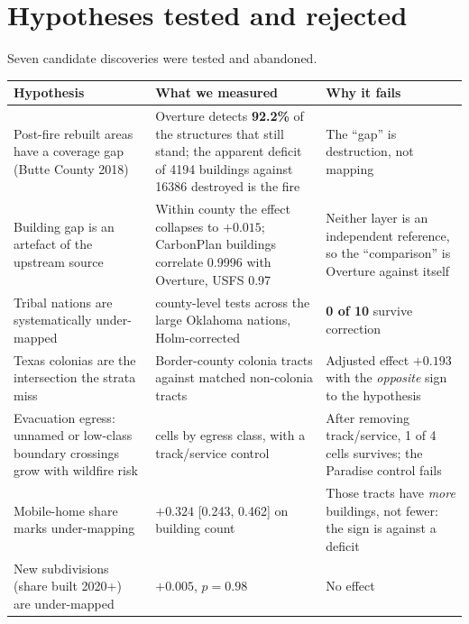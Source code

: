 \documentclass[a4paper]{article}
\begin{document}
\section{Hypotheses tested and rejected}

Seven candidate discoveries were tested and abandoned.

\noindent\begin{minipage}{\textwidth}
\small
{}
\label{tab:rejected}
\begin{tabular}{@{}>{\raggedright\arraybackslash}p{3.2cm}>{\raggedright\arraybackslash}p{4.9cm}>{\raggedright\arraybackslash}p{4.8cm}@{}}
\toprule
Hypothesis & What we measured & Why it fails \\
\midrule
Post-fire rebuilt areas have a coverage gap (Butte County 2018) & Overture detects
\textbf{92.2\%} of the structures that still stand; the apparent deficit of \num{4194}
buildings against \num{16386} destroyed is the fire & The ``gap'' is destruction, not mapping \\
Building gap is an artefact of the upstream source & Within county the effect collapses to
$+\num{0.015}$; CarbonPlan buildings correlate \num{0.9996} with Overture, USFS \num{0.97} &
Neither layer is an independent reference, so the ``comparison'' is Overture against itself \\
Tribal nations are systematically under-mapped & 10 county-level tests across the large
Oklahoma nations, Holm-corrected & \textbf{0 of 10} survive correction \\
Texas colonias are the intersection the strata miss & Border-county colonia tracts against
matched non-colonia tracts & Adjusted effect $+\num{0.193}$ with the \emph{opposite} sign to
the hypothesis \\
Evacuation egress: unnamed or low-class boundary crossings grow with wildfire risk & 4 cells
by egress class, with a track/service control & After removing track/service, 1 of 4 cells
survives; the Paradise control fails \\
Mobile-home share marks under-mapping & $+\num{0.324}$ [0.243, 0.462] on building count &
Those tracts have \emph{more} buildings, not fewer: the sign is against a deficit \\
New subdivisions (share built 2020+) are under-mapped & $+\num{0.005}$, $p=0.98$ &
No effect \\
\bottomrule
\end{tabular}
\end{minipage}
\end{document}
